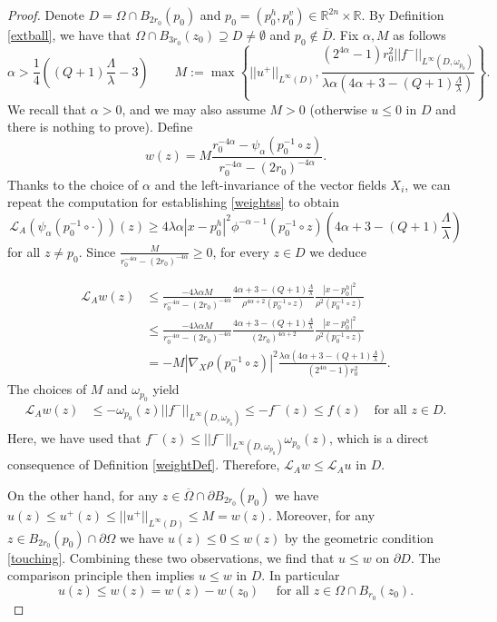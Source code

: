 \documentclass[12pt]{amsart}
\newcommand{\R}{{\mathbb R}}
\def \L {\mathcal{L}}
\def \O {\Omega}
\def \a {\alpha}
\begin{document}
\begin{proof}
Denote $D=\O\cap B_{2r_0}(p_0)$ and $p_0=(p_0^h,p_0^v) \in \R^{2n} \times \R$. By Definition \ref{extball}, we have that $\O\cap B_{3r_0}(z_0) \supseteq D\neq \emptyset$ and $p_0\notin \overline{D}$. Fix $\a, M$ as follows
$$
\a>\frac{1}{4}\left( (Q+1)\frac{\Lambda}{\lambda} - 3\right)\qquad
M:=\max\left\{ ||u^+||_{L^{\infty}(D)}, 
\frac{(2^{4\a}-1)r_0^2||f^-||_{L^{\infty}(D,\omega_{p_0})}}{\lambda \a(4\a + 3 - (Q+1)\frac{\Lambda}{\lambda})}\right\}.
$$
We recall that $\a>0$, and we may also assume $M>0$ (otherwise $u\leq 0$ in $D$ and there is nothing to prove). Define
\begin{equation}\label{barrLip}
w(z)=M \frac{r_0^{-4\a}-\psi_\a(p_0^{-1}\circ z)}{r_0^{-4\a}-(2 r_0)^{-4\a}}.
\end{equation}
Thanks to the choice of $\a$ and the left-invariance of the vector fields $X_i$, we can repeat the computation for establishing \eqref{weightss} to obtain
$$
\L_A \left( \psi_{\a}(p_0^{-1}\circ \cdot)\right)(z)\geq  4\lambda  \a |x-p_0^h|^2 \phi^{-\alpha-1}(p_0^{-1}\circ z) \left( 4\a + 3 - (Q+1)\frac{\Lambda}{\lambda} \right)
$$
for all $z\neq p_0$. Since $\frac{M}{r_0^{-4\a}-(2 r_0)^{-4\a}} \geq 0$, for every $z\in D$ we deduce

\begin{align*}
\L_A w (z) &\leq \frac{-4\lambda \a M}{r_0^{-4\a}-(2 r_0)^{-4\a}} \frac{ 4\a + 3 - (Q+1)\frac{\Lambda}{\lambda}}{\rho^{4\alpha+2}(p_0^{-1}\circ z)}\frac{|x-p_0^h|^2}{\rho^2(p_0^{-1}\circ z)}\\
&\leq \frac{-4\lambda \a M}{r_0^{-4\a}-(2 r_0)^{-4\a}} \frac{ 4\a + 3 - (Q+1)\frac{\Lambda}{\lambda}}{(2 r_0)^{4\a+2}}\frac{|x-p_0^h|^2}{\rho^2(p_0^{-1}\circ z)}\\
&=-M|\nabla_X\rho (p_0^{-1}\circ z)|^{2}\frac{\lambda \a(4\a + 3 - (Q+1)\frac{\Lambda}{\lambda})}{(2^{4\a}-1)r_0^2}.
\end{align*}
The choices of $M$ and $\omega_{p_0}$ yield
\begin{align*}
\L_A w (z) &\leq -\omega_{p_0}(z) ||f^-||_{L^{\infty}(D,\omega_{p_0})} %
\leq -f^-(z)\leq f(z) \quad \text{for all } z \in D.
\end{align*}
Here, we have used that $f^{-}(z)\leq  ||f^-||_{L^{\infty}(D,\omega_{p_0})}\omega_{p_0}(z)$, which is a direct consequence of Definition \ref{weightDef}. Therefore, $\L_A w\leq \L_A u$ in $D$. 

On the other hand, for any $z\in \overline{\O}\cap \partial B_{2r_0}(p_0)$ we have $u(z)\leq u^+(z)\leq ||u^+||_{L^{\infty}(D)} \leq M =w(z)$. Moreover, for any $z\in B_{2r_0}(p_0)\cap \partial \O $ we have $u(z)\leq 0\leq w(z)$ by the geometric condition \eqref{touching}. Combining these two observations, we find that $u\leq w$ on $\partial D$. The comparison principle then implies $u \leq w$ in $D$. In particular
\begin{equation}\label{nowLagrangia}
u(z)\leq w(z)=w(z)-w(z_0) \quad\mbox{ for all }z\in \O\cap B_{r_0}(z_0).
\end{equation}


\end{proof}
\end{document}
